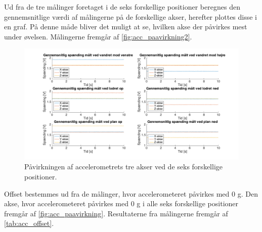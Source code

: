 Ud fra de tre målinger foretaget i de seks forskellige positioner beregnes den gennemsnitlige værdi af målingerne på de forskellige akser, herefter plottes disse i en graf. På denne måde bliver det muligt at se, hvilken akse der påvirkes mest under øvelsen. Målingerne fremgår af \autoref{fig:acc_paavirkning2}. 

\begin{figure}[H]
\centering
\includegraphics[width=1.0\textwidth]{figures/paavirkning}
\caption{Påvirkningen af accelerometrets tre akser ved de seks forskellige positioner.}
\label{fig:acc_paavirkning2}
\end{figure}

Offset bestemmes ud fra de målinger, hvor accelerometeret påvirkes med 0 g. Den akse, hvor accelerometeret påvirkes med 0 g i alle seks forskellige positioner fremgår af \autoref{fig:acc_paavirkning}. Resultaterne fra målingerne fremgår af \autoref{tab:acc_offset}. 

